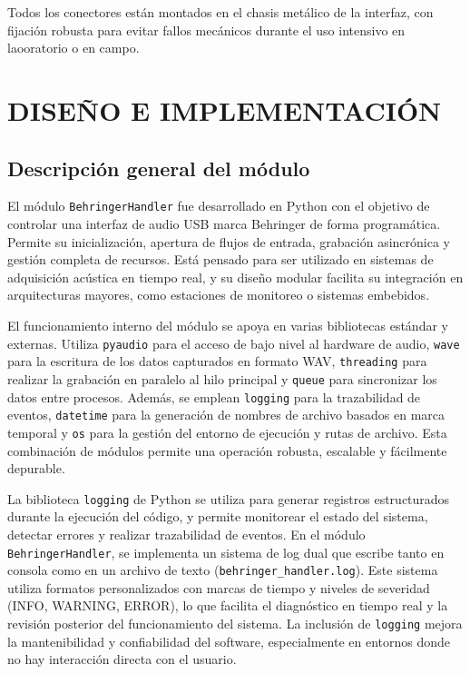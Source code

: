 Todos los conectores están montados en el chasis metálico de la interfaz, con fijación robusta para evitar fallos mecánicos durante el uso intensivo en laooratorio o en campo.



	
\clearpage
\section{DISEÑO E IMPLEMENTACIÓN }

\subsection{Descripción general del módulo}

El módulo \texttt{BehringerHandler} fue desarrollado en Python con el objetivo de controlar una interfaz de audio USB marca Behringer de forma programática. Permite su inicialización, apertura de flujos de entrada, grabación asincrónica y gestión completa de recursos. Está pensado para ser utilizado en sistemas de adquisición acústica en tiempo real, y su diseño modular facilita su integración en arquitecturas mayores, como estaciones de monitoreo o sistemas embebidos.

El funcionamiento interno del módulo se apoya en varias bibliotecas estándar y externas. Utiliza \texttt{pyaudio} para el acceso de bajo nivel al hardware de audio, \texttt{wave} para la escritura de los datos capturados en formato WAV, \texttt{threading} para realizar la grabación en paralelo al hilo principal y \texttt{queue} para sincronizar los datos entre procesos. Además, se emplean \texttt{logging} para la trazabilidad de eventos, \texttt{datetime} para la generación de nombres de archivo basados en marca temporal y \texttt{os} para la gestión del entorno de ejecución y rutas de archivo. Esta combinación de módulos permite una operación robusta, escalable y fácilmente depurable.

La biblioteca \texttt{logging} de Python se utiliza para generar registros estructurados durante la ejecución del código, y permite monitorear el estado del sistema, detectar errores y realizar trazabilidad de eventos. En el módulo \texttt{BehringerHandler}, se implementa un sistema de log dual que escribe tanto en consola como en un archivo de texto (\texttt{behringer\_handler.log}). Este sistema utiliza formatos personalizados con marcas de tiempo y niveles de severidad (INFO, WARNING, ERROR), lo que facilita el diagnóstico en tiempo real y la revisión posterior del funcionamiento del sistema. La inclusión de \texttt{logging} mejora la mantenibilidad y confiabilidad del software, especialmente en entornos donde no hay interacción directa con el usuario.

